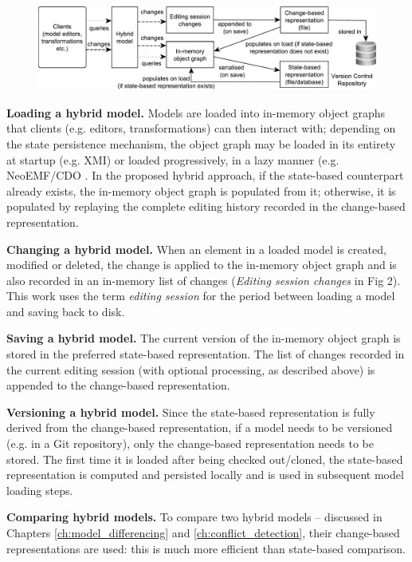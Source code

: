 \begin{figure}[t]
  \includegraphics[width=\linewidth]{images/hybrid_persistence}
  \label{fig:hybrid_persistence}
\end{figure}

\textbf{Loading a hybrid model.} Models are loaded into in-memory object graphs that clients (e.g. editors, transformations) can then interact with; depending on the state persistence mechanism, the object graph may be loaded in its entirety at startup (e.g. XMI) or loaded progressively, in a lazy manner (e.g. NeoEMF/CDO \cite{daniel2016neoemf,eclipse2019cdo}. In the proposed hybrid approach, if the state-based counterpart already exists, the in-memory object graph is populated from it; otherwise, it is populated by replaying the complete editing history recorded in the change-based representation.

\textbf{Changing a hybrid model.} When an element in a loaded model is created, modified or deleted, the change is applied to the in-memory object graph and is also recorded in an in-memory list of changes (\textit{Editing session changes} in Fig 2). This work uses the term \emph{editing session} for the period between loading a model and saving back to disk. 

\textbf{Saving a hybrid model.} The current version of the in-memory object graph is stored in the preferred state-based representation. The list of changes recorded in the current editing session (with optional processing, as described above) is appended to the change-based representation.

\textbf{Versioning a hybrid model.} Since the state-based representation is fully derived from the change-based representation, if a model needs to be versioned (e.g. in a Git repository), only the change-based representation needs to be stored. The first time it is loaded after being checked out/cloned, the state-based representation is computed and persisted locally and is used in subsequent model loading steps.

\textbf{Comparing hybrid models.} To compare two hybrid models -- discussed in Chapters \ref{ch:model_differencing} and \ref{ch:conflict_detection}, their change-based representations are used: this is much more efficient than state-based comparison. 

